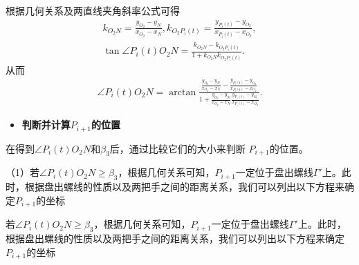 \documentclass[../main.tex]{subfiles}
\begin{document}
\par 根据几何关系及两直线夹角斜率公式可得
\begin{gather}\label{1.........456}
k_{O_2N}=\frac{y_{O_2}-y_N}{x_{O_2}-x_N},k_{O_2P_i\left( t \right)}=\frac{y_{P_i\left( t \right)}-y_{O_2}}{x_{P_i\left( t \right)}-x_{O_2}},
\\
\tan \angle P_i(t)O_2N=\frac{k_{O_2N}-k_{O_2P_i\left( t \right)}}{1+k_{O_2N}k_{O_2P_i\left( t \right)}}.
\end{gather}
从而
\begin{align}\label{1.........457}
\angle P_i(t)O_2N=\arctan \frac{\frac{y_{O_2}-y_N}{x_{O_2}-x_N}-\frac{y_{P_i\left( t \right)}-y_{O_2}}{x_{P_i\left( t \right)}-x_{O_2}}}{1+\frac{y_{O_2}-y_N}{x_{O_2}-x_N}\frac{y_{P_i\left( t \right)}-y_{O_2}}{x_{P_i\left( t \right)}-x_{O_2}}} .
\end{align}
\begin{itemize}
    \item \textbf{判断并计算$P_{i+1}$的位置}
    \end{itemize}
    \par 在得到$\angle P_{i}(t)O_{2}N$和$\beta_{3}$后，通过比较它们的大小来判断 $P_{i + 1} $的位置。
 
    \par （1）若$\angle P_{i}(t)O_{2}N \geq \beta_{3}$，根据几何关系可知，$P_{i + 1}$一定位于盘出螺线$\Gamma'$上。此时，根据盘出螺线的性质以及两把手之间的距离关系，我们可以列出以下方程来确定$ P_{i + 1} $的坐标

\par 若$\angle P_{i}(t)O_{2}N \geq \beta_{3}$，根据几何关系可知，$P_{i + 1}$一定位于盘出螺线$\Gamma'$上。此时，根据盘出螺线的性质以及两把手之间的距离关系，我们可以列出以下方程来确定$ P_{i + 1} $的坐标
\end{document}
